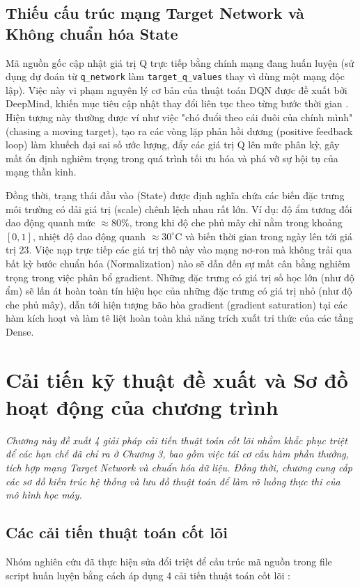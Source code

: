 \documentclass[12pt, a4paper]{report}
\begin{document}
\section{Thiếu cấu trúc mạng Target Network và Không chuẩn hóa State}
Mã nguồn gốc cập nhật giá trị Q trực tiếp bằng chính mạng đang huấn luyện (sử dụng dự đoán từ \texttt{q\_network} làm \texttt{target\_q\_values} thay vì dùng một mạng độc lập). Việc này vi phạm nguyên lý cơ bản của thuật toán DQN được đề xuất bởi DeepMind, khiến mục tiêu cập nhật thay đổi liên tục theo từng bước thời gian \cite{dqn}. Hiện tượng này thường được ví như việc "chó đuổi theo cái đuôi của chính mình" (chasing a moving target), tạo ra các vòng lặp phản hồi dương (positive feedback loop) làm khuếch đại sai số ước lượng, đẩy các giá trị Q lên mức phân kỳ, gây mất ổn định nghiêm trọng trong quá trình tối ưu hóa và phá vỡ sự hội tụ của mạng thần kinh.

Đồng thời, trạng thái đầu vào (State) được định nghĩa chứa các biến đặc trưng môi trường có dải giá trị (scale) chênh lệch nhau rất lớn. Ví dụ: độ ẩm tương đối dao động quanh mức $\approx 80\%$, trong khi độ che phủ mây chỉ nằm trong khoảng $[0, 1]$, nhiệt độ dao động quanh $\approx 30^\circ\text{C}$ và biến thời gian trong ngày lên tới giá trị $23$. Việc nạp trực tiếp các giá trị thô này vào mạng nơ-ron mà không trải qua bất kỳ bước chuẩn hóa (Normalization) nào sẽ dẫn đến sự mất cân bằng nghiêm trọng trong việc phân bổ gradient. Những đặc trưng có giá trị số học lớn (như độ ẩm) sẽ lấn át hoàn toàn tín hiệu học của những đặc trưng có giá trị nhỏ (như độ che phủ mây), dẫn tới hiện tượng bão hòa gradient (gradient saturation) tại các hàm kích hoạt và làm tê liệt hoàn toàn khả năng trích xuất tri thức của các tầng Dense.

\chapter{Cải tiến kỹ thuật đề xuất và Sơ đồ hoạt động của chương trình}

\textit{Chương này đề xuất 4 giải pháp cải tiến thuật toán cốt lõi nhằm khắc phục triệt để các hạn chế đã chỉ ra ở Chương 3, bao gồm việc tái cơ cấu hàm phần thưởng, tích hợp mạng Target Network và chuẩn hóa dữ liệu. Đồng thời, chương cung cấp các sơ đồ kiến trúc hệ thống và lưu đồ thuật toán để làm rõ luồng thực thi của mô hình học máy.}

\section{Các cải tiến thuật toán cốt lõi}
Nhóm nghiên cứu đã thực hiện sửa đổi triệt để cấu trúc mã nguồn trong file script huấn luyện bằng cách áp dụng 4 cải tiến thuật toán cốt lõi \cite{whulx,dqn}:
\end{document}
